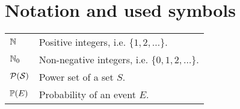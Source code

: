\section*{Notation and used symbols}
	
	\begin{tabularx}{\textwidth}{p{3em} X}
		$\mathbb{N}$ & Positive integers, i.e. $\{1, 2, \ldots\}$.\\
		$\mathbb{N}_0$ & Non-negative integers, i.e. $\{0, 1, 2, \ldots\}$.\\
		$\cal P(S)$ & Power set of a set $S$.\\
		$\mathbb{P}(E)$ & Probability of an event $E$.
	\end{tabularx}
	
	
	
	
